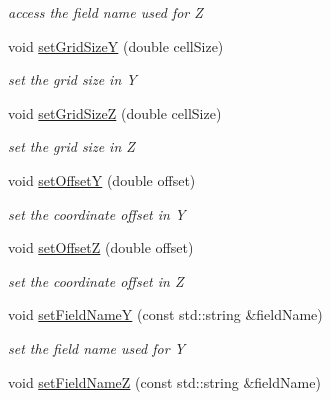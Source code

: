 \begin{DoxyCompactItemize}
\begin{DoxyCompactList}\small\item\em access the field name used for Z \item\end{DoxyCompactList}\item 
void \hyperlink{class_d_d4hep_1_1_d_d_segmentation_1_1_cartesian_grid_y_z_a0062b881400bc655da7f75720d27af7b}{setGridSizeY} (double cellSize)
\begin{DoxyCompactList}\small\item\em set the grid size in Y \item\end{DoxyCompactList}\item 
void \hyperlink{class_d_d4hep_1_1_d_d_segmentation_1_1_cartesian_grid_y_z_a96633e1fe0220512513a35ad41136b6d}{setGridSizeZ} (double cellSize)
\begin{DoxyCompactList}\small\item\em set the grid size in Z \item\end{DoxyCompactList}\item 
void \hyperlink{class_d_d4hep_1_1_d_d_segmentation_1_1_cartesian_grid_y_z_acc72b1c4ab17cebf45e596f6afaf5f2e}{setOffsetY} (double offset)
\begin{DoxyCompactList}\small\item\em set the coordinate offset in Y \item\end{DoxyCompactList}\item 
void \hyperlink{class_d_d4hep_1_1_d_d_segmentation_1_1_cartesian_grid_y_z_a396883c33c1eb30aac6e5dc2c21a7f66}{setOffsetZ} (double offset)
\begin{DoxyCompactList}\small\item\em set the coordinate offset in Z \item\end{DoxyCompactList}\item 
void \hyperlink{class_d_d4hep_1_1_d_d_segmentation_1_1_cartesian_grid_y_z_abd0b24749554d02acb6fb5ffa5e15335}{setFieldNameY} (const std::string \&fieldName)
\begin{DoxyCompactList}\small\item\em set the field name used for Y \item\end{DoxyCompactList}\item 
void \hyperlink{class_d_d4hep_1_1_d_d_segmentation_1_1_cartesian_grid_y_z_ad6d2428895d3f1842bd4d6add72658d2}{setFieldNameZ} (const std::string \&fieldName)

\end{DoxyCompactItemize}
